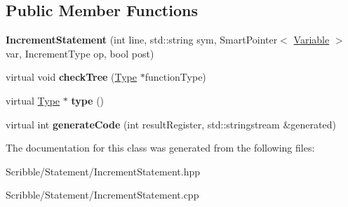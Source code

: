\subsection*{Public Member Functions}
\begin{DoxyCompactItemize}
\item 
\hypertarget{class_increment_statement_ac343d43a10004040a73a91910867fb17}{{\bfseries Increment\-Statement} (int line, std\-::string sym, Smart\-Pointer$<$ \hyperlink{class_variable}{Variable} $>$ var, Increment\-Type op, bool post)}\label{class_increment_statement_ac343d43a10004040a73a91910867fb17}

\item 
\hypertarget{class_increment_statement_abf7158efa95803c309b7e304f6fe9f6c}{virtual void {\bfseries check\-Tree} (\hyperlink{class_type}{Type} $\ast$function\-Type)}\label{class_increment_statement_abf7158efa95803c309b7e304f6fe9f6c}

\item 
\hypertarget{class_increment_statement_ab87a7c48eb8cb443f6c2a2adaf749672}{virtual \hyperlink{class_type}{Type} $\ast$ {\bfseries type} ()}\label{class_increment_statement_ab87a7c48eb8cb443f6c2a2adaf749672}

\item 
\hypertarget{class_increment_statement_a8a2c67a373ce482d040afc02d9131900}{virtual int {\bfseries generate\-Code} (int result\-Register, std\-::stringstream \&generated)}\label{class_increment_statement_a8a2c67a373ce482d040afc02d9131900}

\end{DoxyCompactItemize}


The documentation for this class was generated from the following files\-:\begin{DoxyCompactItemize}
\item 
Scribble/\-Statement/Increment\-Statement.\-hpp\item 
Scribble/\-Statement/Increment\-Statement.\-cpp\end{DoxyCompactItemize}
